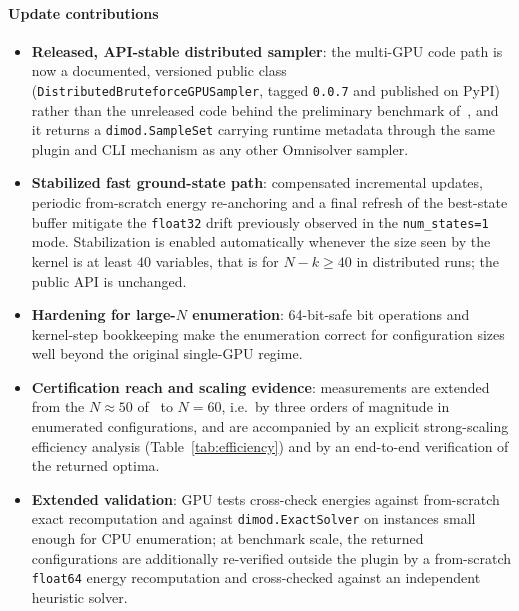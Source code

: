 \documentclass[12pt,a4paper]{elsarticle}
\begin{document}
\paragraph{Update contributions}
\begin{itemize}
    \item \textbf{Released, API-stable distributed sampler}: the multi-GPU code
    path is now a documented, versioned public class
    (\texttt{DistributedBruteforceGPUSampler}, tagged \texttt{0.0.7} and
    published on PyPI) rather than the unreleased code behind the preliminary
    benchmark of~\cite{jalowiecki2021omnisolver}, and it returns a
    \texttt{dimod.SampleSet} carrying runtime metadata through the same plugin
    and CLI mechanism as any other Omnisolver sampler.
    \item \textbf{Stabilized fast ground-state path}: compensated incremental
    updates, periodic from-scratch energy re-anchoring and a final refresh of the
    best-state buffer mitigate the \texttt{float32} drift previously observed
    in the \texttt{num\_states=1} mode. Stabilization is enabled automatically
    whenever the size seen by the kernel is at least $40$ variables, that is for
    $N-k \geq 40$ in distributed runs; the public API is unchanged.
    \item \textbf{Hardening for large-$N$ enumeration}: 64-bit-safe bit
    operations and kernel-step bookkeeping make the enumeration correct for
    configuration sizes well beyond the original single-GPU regime.
    \item \textbf{Certification reach and scaling evidence}: measurements are
    extended from the $N\approx 50$ of~\cite{jalowiecki2021omnisolver} to
    $N=60$, i.e.\ by three orders of magnitude in enumerated configurations, and
    are accompanied by an explicit strong-scaling efficiency analysis
    (Table~\ref{tab:efficiency}) and by an end-to-end verification of the
    returned optima.
    \item \textbf{Extended validation}: GPU tests cross-check energies against
    from-scratch exact recomputation and against \texttt{dimod.ExactSolver} on
    instances small enough for CPU enumeration; at benchmark scale, the returned
    configurations are additionally re-verified outside the plugin by a
    from-scratch \texttt{float64} energy recomputation and cross-checked against
    an independent heuristic solver.
\end{itemize}
\end{document}

